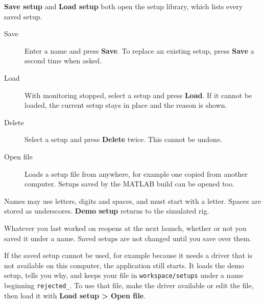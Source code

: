 \documentclass[11pt,a4paper]{article}
\newcommand{\ui}[1]{\textbf{#1}}
\newcommand{\key}[1]{\texttt{#1}}
\begin{document}
\ui{Save setup} and \ui{Load setup} both open the setup library, which lists every saved setup.
\begin{description}
\item[Save] Enter a name and press \ui{Save}. To replace an existing setup, press \ui{Save} a second time when asked.
\item[Load] With monitoring stopped, select a setup and press \ui{Load}. If it cannot be loaded, the current setup stays in place and the reason is shown.
\item[Delete] Select a setup and press \ui{Delete} twice. This cannot be undone.
\item[Open file] Loads a setup file from anywhere, for example one copied from another computer. Setups saved by the MATLAB build can be opened too.
\end{description}
Names may use letters, digits and spaces, and must start with a letter. Spaces are stored as underscores. \ui{Demo setup} returns to the simulated rig.

Whatever you last worked on reopens at the next launch, whether or not you saved it under a name. Saved setups are not changed
until you save over them.

If the saved setup cannot be used, for example because it needs a driver that is not available on this computer,
the application still starts. It loads the demo setup, tells you why, and keeps your file in \key{workspace/setups} under a name
beginning \key{rejected\_}. To use that file, make the driver available or edit the file, then load it with \ui{Load setup > Open file}.
\end{document}
